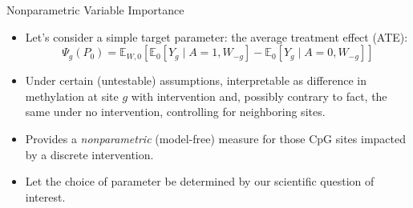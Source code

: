 \documentclass[12pt,t]{beamer}
\begin{document}
\begin{frame}[c]{Nonparametric Variable Importance}

\begin{center}
\begin{itemize}
  \itemsep8pt
  \item Let's consider a simple target parameter: the average treatment effect
    (ATE):
    \[
      \Psi_g(P_0) = \mathbb{E}_{W,0}[\mathbb{E}_0[Y_g \mid A = 1, W_{-g}] -
      \mathbb{E}_0[Y_g \mid A = 0, W_{-g}]]
    \]
  \item Under certain (untestable) assumptions, interpretable as difference in
    methylation at site $g$ with intervention and, possibly contrary to
    fact, the same under no intervention, controlling for neighboring sites.
  \item Provides a \textit{nonparametric} (model-free) measure for those CpG
    sites impacted by a discrete intervention.
  \item Let the choice of parameter be determined by our scientific question of
    interest.
\end{itemize}
\end{center}


\end{frame}

\end{document}

